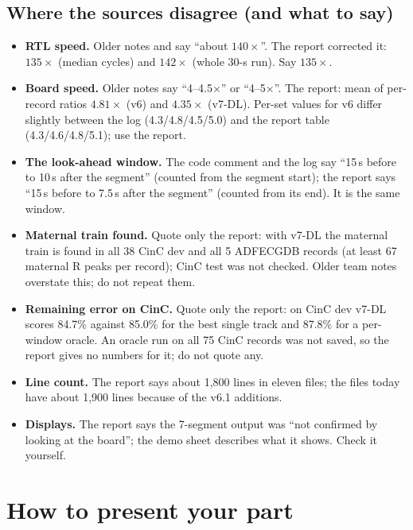 \documentclass[11pt]{article}
\begin{document}
\subsection*{Where the sources disagree (and what to say)}
\begin{itemize}
  \item \textbf{RTL speed.} Older notes and  say ``about $140\times$''. The report corrected it: $135\times$ (median cycles) and $142\times$ (whole 30-s run). Say $135\times$.
  \item \textbf{Board speed.} Older notes say ``4--4.5$\times$'' or ``4--5$\times$''. The report: mean of per-record ratios $4.81\times$ (v6) and $4.35\times$ (v7-DL). Per-set values for v6 differ slightly between the log (4.3/4.8/4.5/5.0) and the report table (4.3/4.6/4.8/5.1); use the report.
  \item \textbf{The look-ahead window.} The code comment and the log say ``15\,s before to 10\,s after the segment'' (counted from the segment start); the report says ``15\,s before to 7.5\,s after the segment'' (counted from its end). It is the same window.
  \item \textbf{Maternal train found.} Quote only the report: with v7-DL the maternal train is found in all 38 CinC dev and all 5 ADFECGDB records (at least 67 maternal R peaks per record); CinC test was not checked. Older team notes overstate this; do not repeat them.
  \item \textbf{Remaining error on CinC.} Quote only the report: on CinC dev v7-DL scores 84.7\% against 85.0\% for the best single track and 87.8\% for a per-window oracle. An oracle run on all 75 CinC records was not saved, so the report gives no numbers for it; do not quote any.
  \item \textbf{Line count.} The report says about 1,800 lines in eleven files; the files today have about 1,900 lines because of the v6.1 additions.
  \item \textbf{Displays.} The report says the 7-segment output was ``not confirmed by looking at the board''; the demo sheet describes what it shows. Check it yourself.
\end{itemize}

\section{How to present your part}
\end{document}

